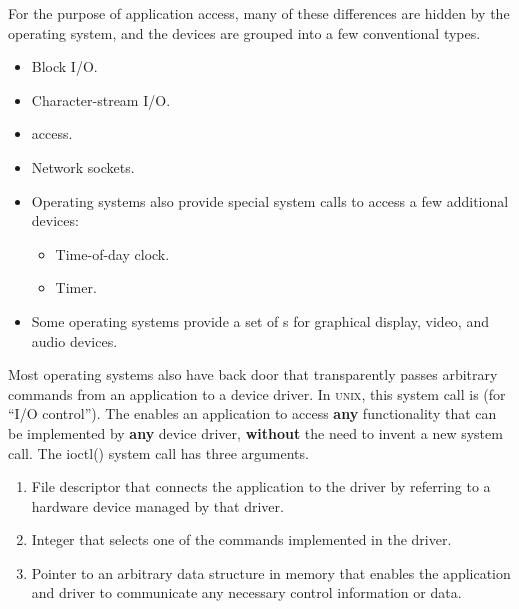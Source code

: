 For the purpose of application access, many of these differences are hidden by the operating system, and the devices are grouped into a few conventional types.
\begin{itemize}[noitemsep]
\item Block I/O.
\item Character-stream I/O.
\item {} access.
\item Network sockets.
\item Operating systems also provide special system calls to access a few additional devices:
  \begin{itemize}[noitemsep]
  \item Time-of-day clock.
  \item Timer.
\end{itemize}

\item Some operating systems provide a set of s for graphical display, video, and audio devices.
\end{itemize}

Most operating systems also have back door that transparently passes arbitrary commands from an application to a device driver.
In \textsc{unix}, this system call is  (for ``I/O control'').
The   enables an application to access \textbf{any} functionality that can be implemented by \textbf{any} device driver, \textbf{without} the need to invent a new system call.
The ioctl() system call has three arguments.
\begin{enumerate}[noitemsep]
\item File descriptor that connects the application to the driver by referring to a hardware device managed by that driver.
\item Integer that selects one of the commands implemented in the driver.
\item Pointer to an arbitrary data structure in memory that enables the application and driver to communicate any necessary control information or data.
\end{enumerate}

